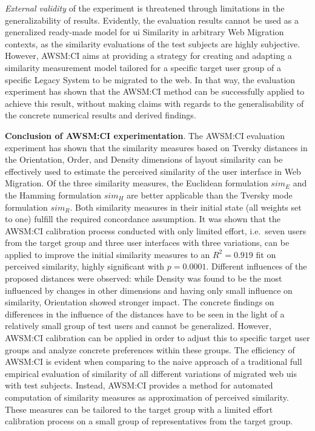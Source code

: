 \emph{External validity} of the experiment is threatened through limitations in the generalizability of results.
Evidently, the evaluation results cannot be used as a generalized ready-made model for \gls{ui} Similarity in arbitrary \gls{Web Migration} contexts, as the similarity evaluations of the test subjects are highly subjective.
However, AWSM:CI aims at providing a strategy for creating and adapting a similarity measurement model tailored for a specific target user group of a specific \gls{Legacy System} to be migrated to the \gls{web}.
In that way, the evaluation experiment has shown that the AWSM:CI method can be successfully applied to achieve this result, without making claims with regards to the generalisability of the concrete numerical results and derived findings.

\textbf{Conclusion of AWSM:CI experimentation}. The AWSM:CI evaluation experiment has shown that the similarity measures based on Tversky distances in the Orientation, Order, and Density dimensions of layout similarity can be effectively used to estimate the perceived similarity of the user interface in \gls{Web Migration}.
Of the three similarity measures, the Euclidean formulation \(sim_E\) and the Hamming formulation \(sim_H\) are better applicable than the Tversky mode formulation \(sim_R\).
Both similarity measures in their initial state (all weights set to one) fulfill the required concordance assumption.
It was shown that the AWSM:CI calibration process conducted with only limited effort, i.e.~seven users from the target group and three user interfaces with three variations, can be applied to improve the initial similarity measures to an \(R^2=0.919\) fit on perceived similarity, highly significant with \(p=0.0001\).
Different influences of the proposed distances were observed: while Density was found to be the most influenced by changes in other dimensions and having only small influence on similarity, Orientation showed stronger impact.
The concrete findings on differences in the influence of the distances have to be seen in the light of a relatively small group of test users and cannot be generalized.
However, AWSM:CI calibration can be applied in order to adjust this to specific target user groups and analyze concrete preferences within these groups.
The efficiency of AWSM:CI is evident when comparing to the naive approach of a traditional full empirical evaluation of similarity of all different variations of migrated \gls{web} \glspl{ui} with test subjects.
Instead, AWSM:CI provides a method for automated computation of similarity measures as approximation of perceived similarity.
These measures can be tailored to the target group with a limited effort calibration process on a small group of representatives from the target group.

